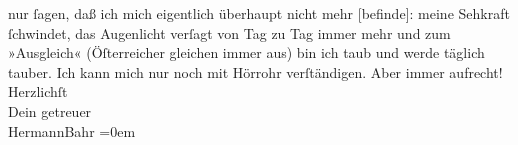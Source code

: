 \begin{ledgroupsized}[t]{13cm}
               nur ſagen, daß ich mich eigentlich überhaupt nicht {\pb}mehr {[}befinde{]}: meine Sehkraft ſchwindet, das Augenlicht verſagt
               von Tag zu Tag immer mehr und zum »Ausgleich« (Öſterreicher gleichen immer aus) bin ich taub und werde täglich tauber. Ich
               kann mich nur noch mit Hörrohr verſtändigen.\pend
           \pstart
           Aber immer aufrecht!{\\[\baselineskip]}Herzlichſt{\\[\baselineskip]}Dein getreuer{\\[\baselineskip]}\spacefill\mbox{HermannBahr}\pend
           \leftskip=0em{}\endnumbering{}\end{ledgroupsized}  \newcommand{\dateiname}{L02547}\newcommand{\titel}{Hermann Bahr an Arthur Schnitzler, 7. 9. 1931}\newcommand{\editorInnen}{ Kurt Ifkovits,  Martin Anton Müller}
      